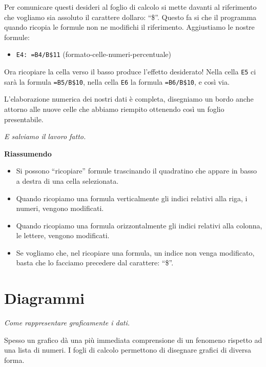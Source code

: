 Per comunicare questi desideri al foglio di calcolo si mette davanti
al riferimento che vogliamo sia assoluto il carattere dollaro: ``\$''.
Questo fa si che il programma quando ricopia le formule non ne modifichi
il riferimento.
Aggiustiamo le nostre formule:

\begin{itemize}
\item {}
\texttt{E4: =B4/B\$11}
(formato-celle-numeri-percentuale)

\end{itemize}

Ora ricopiare la cella verso il basso produce l'effetto desiderato!
Nella cella \texttt{E5} ci sarà la formula \texttt{=B5/B\$10},
nella cella \texttt{E6} la formula \texttt{=B6/B\$10}, e così via.

L'elaborazione numerica dei nostri dati è completa,
disegniamo un bordo anche attorno alle nuove celle che abbiamo
riempito ottenendo così un foglio presentabile.

\emph{E salviamo il lavoro fatto.}

\textbf{Riassumendo}
\begin{itemize}
\item {} 
Si possono ``ricopiare'' formule trascinando il quadratino che appare in
basso a destra di una cella selezionata.

\item {} 
Quando ricopiamo una formula verticalmente gli indici relativi alla riga,
i numeri, vengono modificati.

\item {} 
Quando ricopiamo una formula orizzontalmente gli indici relativi alla
colonna, le lettere, vengono modificati.

\item {} 
Se vogliamo che, nel ricopiare una formula, un indice non venga modificato,
basta che lo facciamo precedere dal carattere: ``\$''.

\end{itemize}

\section{Diagrammi}
\label{05_01_f_di_calc:diagrammi}

\emph{Come rappresentare graficamente i dati.}

Spesso un grafico dà una più immediata comprensione di un fenomeno rispetto
ad una lista di numeri.
I fogli di calcolo permettono di disegnare grafici di diversa forma.

